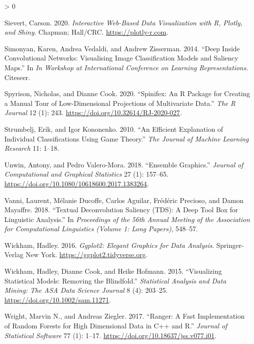 \documentclass[
]{article}
\newlength{\cslhangindent}
\newenvironment{CSLReferences}[2] %
 {%
  \setlength{\parindent}{0pt}
  \ifodd #1 \everypar{\setlength{\hangindent}{\cslhangindent}}\ignorespaces\fi
  \ifnum #2 > 0
  \setlength{\parskip}{#2\baselineskip}
  \fi
 }%
 {}
\begin{document}
\begin{CSLReferences}{1}{0}
\leavevmode\hypertarget{ref-sievert_interactive_2020}{}%
Sievert, Carson. 2020. \emph{Interactive {Web}-{Based} {Data}
{Visualization} with {R}, Plotly, and Shiny}. Chapman; Hall/CRC.
\url{https://plotly-r.com}.

\leavevmode\hypertarget{ref-simonyan_deep_2014}{}%
Simonyan, Karen, Andrea Vedaldi, and Andrew Zisserman. 2014. {``Deep
Inside Convolutional Networks: {Visualising} Image Classification Models
and Saliency Maps.''} In \emph{In {Workshop} at {International}
{Conference} on {Learning} {Representations}}. Citeseer.

\leavevmode\hypertarget{ref-spyrison_spinifex_2020}{}%
Spyrison, Nicholas, and Dianne Cook. 2020. {``Spinifex: An {R} {Package}
for {Creating} a {Manual} {Tour} of {Low}-Dimensional {Projections} of
{Multivariate} {Data}.''} \emph{The R Journal} 12 (1): 243.
\url{https://doi.org/10.32614/RJ-2020-027}.

\leavevmode\hypertarget{ref-strumbelj_efficient_2010}{}%
Strumbelj, Erik, and Igor Kononenko. 2010. {``An Efficient Explanation
of Individual Classifications Using Game Theory.''} \emph{The Journal of
Machine Learning Research} 11: 1--18.

\leavevmode\hypertarget{ref-unwin_ensemble_2018}{}%
Unwin, Antony, and Pedro Valero-Mora. 2018. {``Ensemble {Graphics}.''}
\emph{Journal of Computational and Graphical Statistics} 27 (1):
157--65. \url{https://doi.org/10.1080/10618600.2017.1383264}.

\leavevmode\hypertarget{ref-vanni_textual_2018}{}%
Vanni, Laurent, Mélanie Ducoffe, Carlos Aguilar, Frédéric Precioso, and
Damon Mayaffre. 2018. {``Textual {Deconvolution} {Saliency} ({TDS}): A
Deep Tool Box for Linguistic Analysis.''} In \emph{Proceedings of the
56th {Annual} {Meeting} of the {Association} for {Computational}
{Linguistics} ({Volume} 1: {Long} {Papers})}, 548--57.

\leavevmode\hypertarget{ref-wickham_ggplot2_2016}{}%
Wickham, Hadley. 2016. \emph{Ggplot2: {Elegant} {Graphics} for {Data}
{Analysis}}. Springer-Verlag New York.
\url{https://ggplot2.tidyverse.org}.

\leavevmode\hypertarget{ref-wickham_visualizing_2015}{}%
Wickham, Hadley, Dianne Cook, and Heike Hofmann. 2015. {``Visualizing
Statistical Models: {Removing} the Blindfold.''} \emph{Statistical
Analysis and Data Mining: The ASA Data Science Journal} 8 (4): 203--25.
\url{https://doi.org/10.1002/sam.11271}.

\leavevmode\hypertarget{ref-wright_ranger_2017}{}%
Wright, Marvin N., and Andreas Ziegler. 2017. {``Ranger: {A} {Fast}
{Implementation} of {Random} {Forests} for {High} {Dimensional} {Data}
in {C}++ and {R}.''} \emph{Journal of Statistical Software} 77 (1):
1--17. \url{https://doi.org/10.18637/jss.v077.i01}.

\end{CSLReferences}
\end{document}
